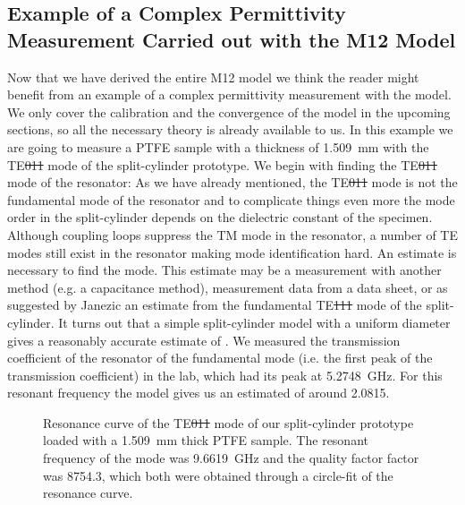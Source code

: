 \subsection{Example of a Complex Permittivity Measurement Carried out with the M12 Model}\label{ss:ptfe}
Now that we have derived the entire M12 model we think the reader might benefit from an example of a complex permittivity measurement with the model. We only cover the calibration and the convergence of the model in the upcoming sections, so all the necessary theory is already available to us. In this example we are going to measure a PTFE sample with a thickness of \SI{1.509}{\milli\meter} with the TE\st{011} mode of the split-cylinder prototype. We begin with finding the TE\st{011} mode of the resonator: As we have already mentioned, the TE\st{011} mode is not the fundamental mode of the resonator and to complicate things even more the mode order in the split-cylinder depends on the dielectric constant of the specimen. Although coupling loops suppress the TM mode in the resonator, a number of TE modes still exist in the resonator making mode identification hard. An \er{} estimate is necessary to find the \te{} mode. This \er{} estimate may be a measurement with another method (e.g. a capacitance method), measurement data from a data sheet, or as suggested by Janezic \cite{janezicarz} an \er{} estimate from the fundamental TE\st{111} mode of the split-cylinder. It turns out that a simple split-cylinder model with a uniform diameter gives a reasonably accurate estimate of \er{}. We measured the transmission coefficient of the resonator of the fundamental mode (i.e. the first peak of the transmission coefficient) in the lab, which had its peak at \SI{5.2748}{\giga\hertz}. For this resonant frequency the model gives us an estimated \er{} of around 2.0815.
\begin{figure}
\centering
{}
\caption{Resonance curve of the TE\st{011} mode of our split-cylinder prototype loaded with a \SI{1.509}{\milli\meter} thick PTFE sample. The resonant frequency of the mode was \SI{9.6619}{\giga\hertz} and the quality factor factor was \num{8754.3}, which both were obtained through a circle-fit of the resonance curve.}\label{fig:rc_ptfe}
\end{figure}

